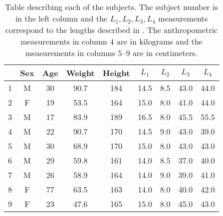 \begin{table}[t!]

  \centering
  \caption{Table describing each of the subjects.
    The subject number is in the left column and the $L_1,L_2,L_3,L_4$
    measurements correspond to the lengths described in .
    The anthropometric measurements in column $4$ are in kilograms and the
    measurements in columns $5$--$9$ are in centimeters.}
  \begin{tabular}{|c|c|c|c|c|c|c|c|c|}
    \hline
    & \!Sex\! & \!Age\! &  \!Weight\! & \!Height\! & $L_1$ & $L_2$ & $L_3$ &
    $L_4$ \\ \hline
    1 & M & 30 & 90.7& 184& 14.5& 8.5& 43.0& 44.0 \\ \hline
    2 & F & 19 & 53.5& 164& 15.0& 8.0& 41.0& 44.0\\ \hline
    3 & M & 17 & 83.9& 189& 16.5& 8.0& 45.5& 55.5 \\ \hline
    4 & M & 22 & 90.7& 170& 14.5& 9.0& 43.0& 39.0\\ \hline
    5 & M & 30 & 68.9& 170& 15.0& 8.0& 43.0& 43.0\\ \hline
    6 & M & 29 & 59.8& 161& 14.0& 8.5& 37.0& 40.0\\ \hline
    7 & M & 26 & 58.9& 164& 14.0& 9.0& 39.0& 41.0\\ \hline
    8 & F & 77 & 63.5& 163& 14.0& 8.0& 40.0& 42.0\\ \hline
    9 & F & 23 & 47.6& 165& 15.0& 8.0& 45.0& 43.0\\ \hline
  \end{tabular}
  \label{tab:measurements}
\end{table}
